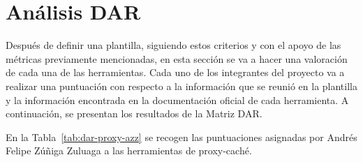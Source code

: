 \section{Análisis DAR}\label{sec:analisis}

Después de definir una plantilla, siguiendo estos criterios y con el
apoyo de las métricas previamente mencionadas, en esta sección se va a
hacer una valoración de cada una de las herramientas. Cada uno de los
integrantes del proyecto va a realizar una puntuación con respecto a la
información que se reunió en la plantilla y la información encontrada en
la documentación oficial de cada herramienta. A continuación, se
presentan los resultados de la Matriz DAR.

En la Tabla~\ref{tab:dar-proxy-azz} se recogen las puntuaciones asignadas por Andrés Felipe
Zúñiga Zuluaga a las herramientas de proxy-caché.

